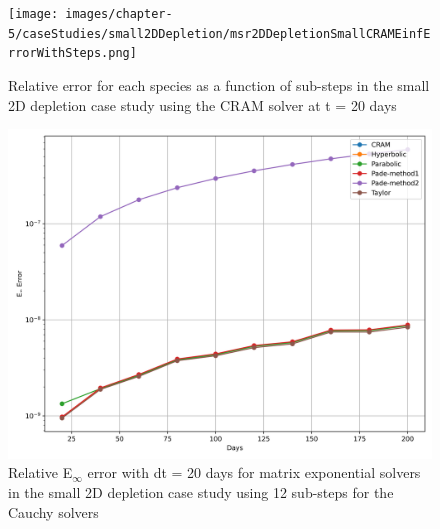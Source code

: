 \clearpage

\begin{landscape}
\thispagestyle{mylandscape}
\begin{figure}[p]
    \centering
    \texttt{[image: images/chapter-5/caseStudies/small2DDepletion/msr2DDepletionSmallCRAMEinfErrorWithSteps.png]}
    \caption{Relative error for each species as a function of sub-steps in the small 2D depletion case study using the CRAM solver at t = 20 days}
    \label{fig:small_2D_depletion_Einf_species_with_substeps}
\end{figure}
\end{landscape}

\clearpage

\begin{figure}[p]
    \centering
    \includegraphics[width=5in]{images/chapter-5/caseStudies/small2DDepletion/msrSmall2DDepletionEinfErrorerrorSteps12.png}
    \caption{Relative E$_{\infty}$ error with dt = 20 days for matrix exponential solvers in the small 2D depletion case study using 12 sub-steps for the Cauchy solvers}
    \label{fig:small_2D_depletion_Einf_steps12}
\end{figure}

\clearpage

